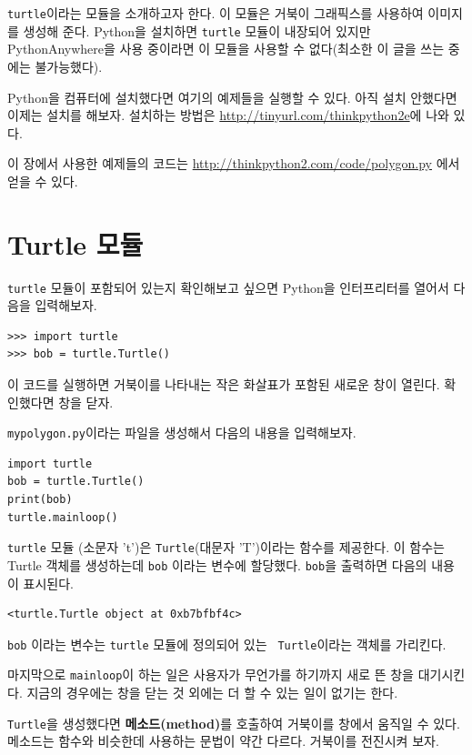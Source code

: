 \documentclass[10pt]{book}
\begin{document}
{\tt turtle}이라는 모듈을 소개하고자 한다.  이 모듈은 거북이 그래픽스를
사용하여 이미지를 생성해 준다.  Python을 설치하면 {\tt turtle} 모듈이
내장되어 있지만 PythonAnywhere을 사용 중이라면 이 모듈을 사용할 수
없다(최소한 이 글을 쓰는 중에는 불가능했다).

Python을 컴퓨터에 설치했다면 여기의 예제들을 실행할 수 있다.  아직 설치
안했다면 이제는 설치를 해보자.  설치하는 방법은
\url{http://tinyurl.com/thinkpython2e}에 나와 있다.

이 장에서 사용한 예제들의 코드는
\url{http://thinkpython2.com/code/polygon.py} 에서 얻을 수 있다.


\section{Turtle 모듈}
\label{turtle}

{\tt turtle} 모듈이 포함되어 있는지 확인해보고 싶으면 Python을
인터프리터를 열어서 다음을 입력해보자.


\begin{verbatim}
>>> import turtle
>>> bob = turtle.Turtle()
\end{verbatim}

이 코드를 실행하면 거북이를 나타내는 작은 화살표가 포함된 새로운 창이
열린다.  확인했다면 창을 닫자.

{\tt mypolygon.py}이라는 파일을 생성해서 다음의 내용을 입력해보자. 


\begin{verbatim}
import turtle
bob = turtle.Turtle()
print(bob)
turtle.mainloop()
\end{verbatim}
%
{\tt turtle} 모듈 (소문자 't')은 {\tt Turtle}(대문자 'T')이라는 함수를
제공한다.  이 함수는 Turtle 객체를 생성하는데 {\tt bob} 이라는 변수에
할당했다.  {\tt bob}을 출력하면 다음의 내용이 표시된다.

\begin{verbatim}
<turtle.Turtle object at 0xb7bfbf4c>
\end{verbatim}
%
{\tt bob} 이라는 변수는 {\tt turtle} 모듈에 정의되어 있는 {\tt
  Turtle}이라는 객체를 가리킨다.

마지막으로 \verb"mainloop"이 하는 일은 사용자가 무언가를 하기까지 새로
뜬 창을 대기시킨다.  지금의 경우에는 창을 닫는 것 외에는 더 할 수 있는
일이 없기는 한다.

\texttt{Turtle}을 생성했다면 {\bf 메소드(method)}를 호출하여 거북이를
창에서 움직일 수 있다.  메소드는 함수와 비슷한데 사용하는 문법이 약간
다르다.  거북이를 전진시켜 보자.
\end{document}
